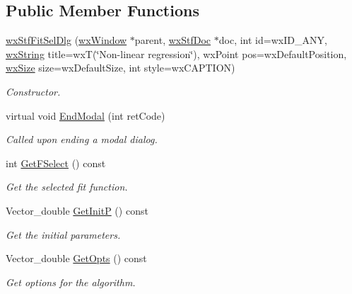 \subsection*{Public Member Functions}
\begin{DoxyCompactItemize}
\item 
\hyperlink{classwxStfFitSelDlg_a2c5cf895ab3d5fdea7809beefc0160ff}{wxStfFitSelDlg} (\hyperlink{classwxWindow}{wxWindow} $\ast$parent, \hyperlink{classwxStfDoc}{wxStfDoc} $\ast$doc, int id=wxID\_\-ANY, \hyperlink{classwxString}{wxString} title=wxT(\char`\"{}Non-\/linear regression\char`\"{}), wxPoint pos=wxDefaultPosition, \hyperlink{classwxSize}{wxSize} size=wxDefaultSize, int style=wxCAPTION)
\begin{DoxyCompactList}\small\item\em Constructor. \item\end{DoxyCompactList}\item 
virtual void \hyperlink{classwxStfFitSelDlg_afd1f6cd692c52c7fa27dc98d9db92b2d}{EndModal} (int retCode)
\begin{DoxyCompactList}\small\item\em Called upon ending a modal dialog. \item\end{DoxyCompactList}\item 
int \hyperlink{classwxStfFitSelDlg_abcedd14c33f68da8f69c0ec160ad3472}{GetFSelect} () const 
\begin{DoxyCompactList}\small\item\em Get the selected fit function. \item\end{DoxyCompactList}\item 
Vector\_\-double \hyperlink{classwxStfFitSelDlg_ad5b512cf9138046c51558586938ac481}{GetInitP} () const 
\begin{DoxyCompactList}\small\item\em Get the initial parameters. \item\end{DoxyCompactList}\item 
Vector\_\-double \hyperlink{classwxStfFitSelDlg_a79cc9b1b357bbd49e65cf1ddb39a3e4d}{GetOpts} () const 
\begin{DoxyCompactList}\small\item\em Get options for the algorithm. \item\end{DoxyCompactList}\item 

\end{DoxyCompactItemize}
